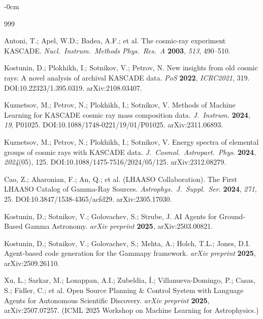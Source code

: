 \documentclass[universe,article,submit,pdftex,oneauthor]{Definitions/mdpi}
\begin{document}
\begin{adjustwidth}{-\extralength}{0cm}


\begin{thebibliography}{999}

Antoni, T.; Apel, W.D.; Badea, A.F.; et al. The cosmic-ray experiment KASCADE. \textit{Nucl.\ Instrum.\ Methods Phys.\ Res.\ A} \textbf{2003}, \textit{513}, 490--510.

Kostunin, D.; Plokhikh, I.; Sotnikov, V.; Petrov, N. New insights from old cosmic rays: A novel analysis of archival KASCADE data. \textit{PoS} \textbf{2022}, \textit{ICRC2021}, 319. DOI:10.22323/1.395.0319. arXiv:2108.03407.

Kuznetsov, M.; Petrov, N.; Plokhikh, I.; Sotnikov, V. Methods of Machine Learning for KASCADE cosmic ray mass composition data. \textit{J.\ Instrum.} \textbf{2024}, \textit{19}, P01025. DOI:10.1088/1748-0221/19/01/P01025. arXiv:2311.06893.

Kuznetsov, M.; Petrov, N.; Plokhikh, I.; Sotnikov, V. Energy spectra of elemental groups of cosmic rays with KASCADE data. \textit{J.\ Cosmol.\ Astropart.\ Phys.} \textbf{2024}, \textit{2024}(05), 125. DOI:10.1088/1475-7516/2024/05/125. arXiv:2312.08279.

Cao, Z.; Aharonian, F.; An, Q.; et al. (LHAASO Collaboration). The First LHAASO Catalog of Gamma-Ray Sources. \textit{Astrophys.\ J.\ Suppl.\ Ser.} \textbf{2024}, \textit{271}, 25. DOI:10.3847/1538-4365/acfd29. arXiv:2305.17030.

Kostunin, D.; Sotnikov, V.; Golovachev, S.; Strube, J. AI Agents for Ground-Based Gamma Astronomy. \textit{arXiv preprint} \textbf{2025}, arXiv:2503.00821.

Kostunin, D.; Sotnikov, V.; Golovachev, S.; Mehta, A.; Holch, T.L.; Jones, D.I. Agent-based code generation for the Gammapy framework. \textit{arXiv preprint} \textbf{2025}, arXiv:2509.26110.

Xu, L.; Sarkar, M.; Lonappan, A.I.; Zubeldia, \'I.; Villanueva-Domingo, P.; Casas, S.; Fidler, C.; et al. Open Source Planning \& Control System with Language Agents for Autonomous Scientific Discovery. \textit{arXiv preprint} \textbf{2025}, arXiv:2507.07257. (ICML 2025 Workshop on Machine Learning for Astrophysics.)


\end{thebibliography}
\end{adjustwidth}
\end{document}
